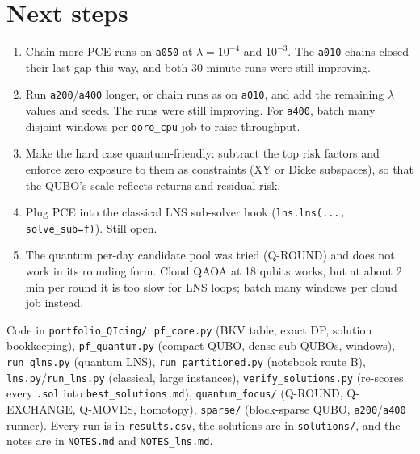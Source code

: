 \documentclass[11pt]{article}
\begin{document}
\section{Next steps}
\begin{enumerate}
\item Chain more PCE runs on \texttt{a050} at $\lambda=10^{-4}$ and $10^{-3}$. The \texttt{a010} chains
  closed their last gap this way, and both 30-minute runs were still improving.
\item Run \texttt{a200}/\texttt{a400} longer, or chain runs as on \texttt{a010}, and add the remaining $\lambda$ values
  and seeds. The runs were still improving. For \texttt{a400}, batch many disjoint windows per
  \texttt{qoro\_cpu} job to raise throughput.
\item Make the hard case quantum-friendly: subtract the top risk factors and enforce zero exposure to them
  as constraints (XY or Dicke subspaces), so that the QUBO's scale reflects returns and residual risk.
\item Plug PCE into the classical LNS sub-solver hook (\texttt{lns.lns(..., solve\_sub=f)}). Still open.
\item The quantum per-day candidate pool was tried (Q-ROUND) and does not work in its rounding form.
  Cloud QAOA at 18 qubits works, but at about 2\,min per round it is too slow for LNS loops; batch
  many windows per cloud job instead.
\end{enumerate}

\vfill\noindent\footnotesize
Code in \texttt{portfolio\_QIcing/}: \texttt{pf\_core.py} (BKV table, exact DP, solution bookkeeping),
\texttt{pf\_quantum.py} (compact QUBO, dense sub-QUBOs, windows), \texttt{run\_qlns.py} (quantum LNS),
\texttt{run\_partitioned.py} (notebook route B), \texttt{lns.py}/\texttt{run\_lns.py} (classical, large instances),
\texttt{verify\_solutions.py} (re-scores every \texttt{.sol} into \texttt{best\_solutions.md}), \texttt{quantum\_focus/} (Q-ROUND, Q-EXCHANGE, Q-MOVES, homotopy), \texttt{sparse/} (block-sparse QUBO, \texttt{a200}/\texttt{a400} runner). Every run is
in \texttt{results.csv}, the solutions are in \texttt{solutions/}, and the notes are in \texttt{NOTES.md} and \texttt{NOTES\_lns.md}.
\end{document}
